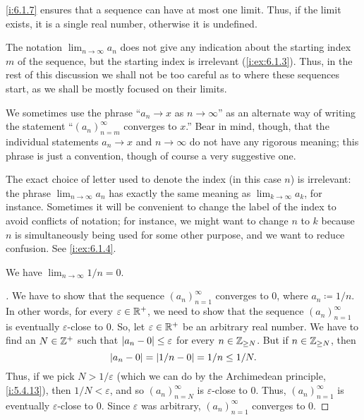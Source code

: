 \begin{note}
  \cref{i:6.1.7} ensures that a sequence can have at most one limit.
  Thus, if the limit exists, it is a single real number, otherwise it is undefined.
\end{note}

\begin{rmk}\label{i:6.1.9}
  The notation \(\lim_{n \to \infty} a_n\) does not give any indication about the starting index \(m\) of the sequence, but the starting index is irrelevant (\cref{i:ex:6.1.3}).
  Thus, in the rest of this discussion we shall not be too careful as to where these sequences start, as we shall be mostly focused on their limits.
\end{rmk}

\begin{note}
  We sometimes use the phrase ``\(a_n \to x\) as \(n \to \infty\)'' as an alternate way of writing the statement ``\((a_n)_{n = m}^\infty\) converges to \(x\).''
  Bear in mind, though, that the individual statements \(a_n \to x\) and \(n \to \infty\) do not have any rigorous meaning;
  this phrase is just a convention, though of course a very suggestive one.
\end{note}

\begin{rmk}\label{i:6.1.10}
  The exact choice of letter used to denote the index (in this case \(n\)) is irrelevant:
  the phrase \(\lim_{n \to \infty} a_n\) has exactly the same meaning as \(\lim_{k \to \infty} a_k\), for instance.
  Sometimes it will be convenient to change the label of the index to avoid conflicts of notation;
  for instance, we might want to change \(n\) to \(k\) because \(n\) is simultaneously being used for some other purpose, and we want to reduce confusion.
  See \cref{i:ex:6.1.4}.
\end{rmk}

\begin{prop}\label{i:6.1.11}
  We have \(\lim_{n \to \infty} 1 / n = 0\).
\end{prop}

\begin{proof}[]
  We have to show that the sequence \((a_n)_{n = 1}^\infty\) converges to \(0\), where \(a_n \coloneqq 1 / n\).
  In other words, for every \(\varepsilon \in \mathbb{R}^+\), we need to show that the sequence \((a_n)_{n = 1}^\infty\) is eventually \(\varepsilon\)-close to \(0\).
  So, let \(\varepsilon \in \mathbb{R}^+\) be an arbitrary real number.
  We have to find an \(N \in \mathbb{Z}^+\) such that \(\left\lvert a_n - 0\right\rvert \leq \varepsilon\) for every \(n \in \mathbb{Z}_{\geq N}\).
  But if \(n \in \mathbb{Z}_{\geq N}\), then
  \[
    \left\lvert a_n - 0\right\rvert = \left\lvert1 / n - 0\right\rvert = 1 / n \leq 1 / N.
  \]
  Thus, if we pick \(N > 1 / \varepsilon\) (which we can do by the Archimedean principle, \cref{i:5.4.13}), then \(1 / N < \varepsilon\), and so \((a_n)_{n = N}^\infty\) is \(\varepsilon\)-close to \(0\).
  Thus, \((a_n)_{n = 1}^\infty\) is eventually \(\varepsilon\)-close to \(0\).
  Since \(\varepsilon\) was arbitrary, \((a_n)_{n = 1}^\infty\) converges to \(0\).
\end{proof}

